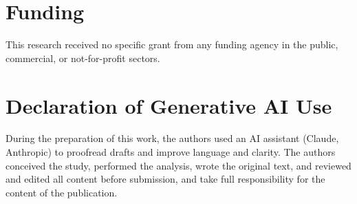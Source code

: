 \documentclass[preprint,12pt]{elsarticle}
\begin{document}
\section*{Funding}
This research received no specific grant from any funding agency in the public, commercial, or
not-for-profit sectors.

\section*{Declaration of Generative AI Use}
During the preparation of this work, the authors used an AI assistant (Claude, Anthropic) to
proofread drafts and improve language and clarity. The authors conceived the study, performed
the analysis, wrote the original text, and reviewed and edited all content before submission,
and take full responsibility for the content of the publication.
\end{document}
